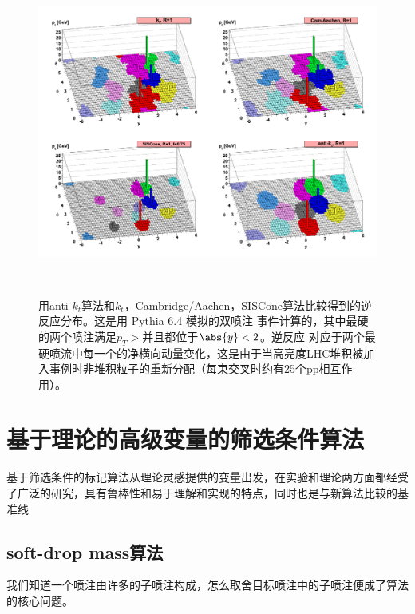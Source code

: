 \begin{figure}[H]
 \centering
 \caption{用anti-$k_t$算法和$k_t$，Cambridge/Aachen，SISCone算法比较得到的逆反应分布。这是用 Pythia 6.4 模拟的双喷注 事件计算的，其中最硬的两个喷注满足$p_T>$并且都位于$\abs{y}<2$。逆反应
对应于两个最硬喷流中每一个的净横向动量变化，这是由于当高亮度LHC堆积被加入事例时非堆积粒子的重新分配（每束交叉时约有25个pp相互作用）。}
 \includegraphics[height=10cm, width=13cm]{pictures/anti-kt-3D.png}
 \label{fig2.2}
\end{figure}

\section{基于理论的高级变量的筛选条件算法}
基于筛选条件的标记算法从理论灵感提供的变量出发，在实验和理论两方面都经受了广泛的研究，具有鲁棒性和易于理解和实现的特点，同时也是与新算法比较的基准线
\subsection{soft-drop mass算法}
我们知道一个喷注由许多的子喷注构成，怎么取舍目标喷注中的子喷注便成了算法的核心问题。

